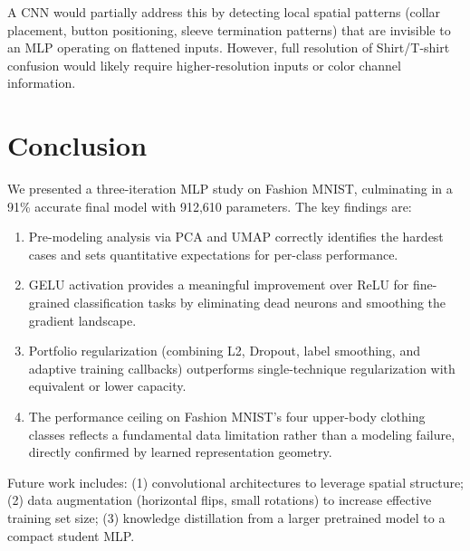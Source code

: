 \documentclass[12pt,letterpaper]{article}
\begin{document}
A CNN would partially address this by detecting local spatial patterns (collar placement, button positioning, sleeve termination patterns) that are invisible to an MLP operating on flattened inputs. However, full resolution of Shirt/T-shirt confusion would likely require higher-resolution inputs or color channel information.

\section{Conclusion}
\label{sec:conclusion}

We presented a three-iteration MLP study on Fashion MNIST, culminating in a 91\% accurate final model with 912,610 parameters. The key findings are:

\begin{enumerate}
    \item Pre-modeling analysis via PCA and UMAP correctly identifies the hardest cases and sets quantitative expectations for per-class performance.
    \item GELU activation provides a meaningful improvement over ReLU for fine-grained classification tasks by eliminating dead neurons and smoothing the gradient landscape.
    \item Portfolio regularization (combining L2, Dropout, label smoothing, and adaptive training callbacks) outperforms single-technique regularization with equivalent or lower capacity.
    \item The performance ceiling on Fashion MNIST's four upper-body clothing classes reflects a fundamental data limitation rather than a modeling failure, directly confirmed by learned representation geometry.
\end{enumerate}

Future work includes: (1) convolutional architectures to leverage spatial structure; (2) data augmentation (horizontal flips, small rotations) to increase effective training set size; (3) knowledge distillation from a larger pretrained model to a compact student MLP.
\end{document}
